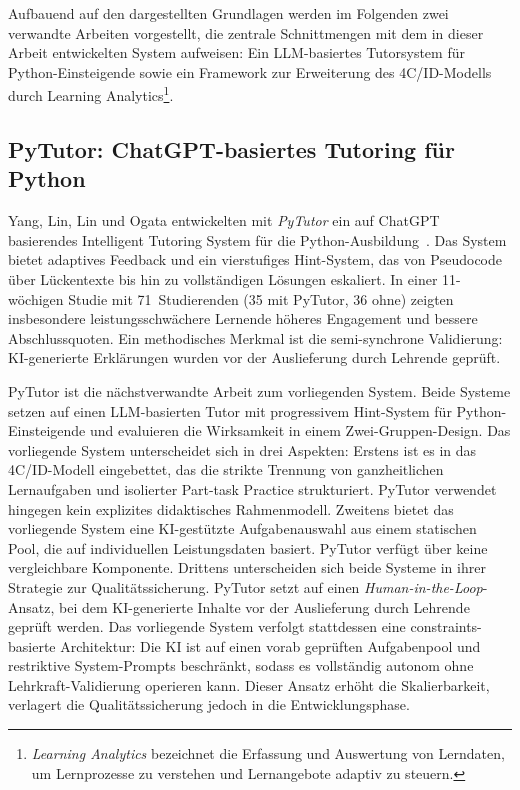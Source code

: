 Aufbauend auf den dargestellten Grundlagen werden im Folgenden zwei verwandte Arbeiten vorgestellt, die zentrale Schnittmengen mit dem in dieser Arbeit entwickelten System aufweisen: Ein LLM-basiertes Tutorsystem für Python-Einsteigende sowie ein Framework zur Erweiterung des 4C/ID-Modells durch Learning Analytics\footnote{\textit{Learning Analytics} bezeichnet die Erfassung und Auswertung von Lerndaten, um Lernprozesse zu verstehen und Lernangebote adaptiv zu steuern.}.

\subsection{PyTutor: ChatGPT-basiertes Tutoring für Python}\label{subsec:pytutor}

Yang, Lin, Lin und Ogata entwickelten mit \textit{PyTutor} ein auf ChatGPT basierendes Intelligent Tutoring System für die Python-Ausbildung~\cite{yang2024pytutor}. Das System bietet adaptives Feedback und ein vierstufiges Hint-System, das von Pseudocode über Lückentexte bis hin zu vollständigen Lösungen eskaliert. In einer 11-wöchigen Studie mit 71~Studierenden (35 mit PyTutor, 36 ohne) zeigten insbesondere leistungsschwächere Lernende höheres Engagement und bessere Abschlussquoten. Ein methodisches Merkmal ist die semi-synchrone Validierung: KI-generierte Erklärungen wurden vor der Auslieferung durch Lehrende geprüft.

PyTutor ist die nächstverwandte Arbeit zum vorliegenden System. Beide Systeme setzen auf einen LLM-basierten Tutor mit progressivem Hint-System für Python-Einsteigende und evaluieren die Wirksamkeit in einem Zwei-Gruppen-Design. Das vorliegende System unterscheidet sich in drei Aspekten: Erstens ist es in das 4C/ID-Modell eingebettet, das die strikte Trennung von ganzheitlichen Lernaufgaben und isolierter Part-task Practice strukturiert. PyTutor verwendet hingegen kein explizites didaktisches Rahmenmodell. Zweitens bietet das vorliegende System eine KI-gestützte Aufgabenauswahl aus einem statischen Pool, die auf individuellen Leistungsdaten basiert. PyTutor verfügt über keine vergleichbare Komponente. Drittens unterscheiden sich beide Systeme in ihrer Strategie zur Qualitätssicherung. PyTutor setzt auf einen \textit{Human-in-the-Loop}-Ansatz, bei dem KI-generierte Inhalte vor der Auslieferung durch Lehrende geprüft werden. Das vorliegende System verfolgt stattdessen eine constraints-basierte Architektur: Die KI ist auf einen vorab geprüften Aufgabenpool und restriktive System-Prompts beschränkt, sodass es vollständig autonom ohne Lehrkraft-Validierung operieren kann. Dieser Ansatz erhöht die Skalierbarkeit, verlagert die Qualitätssicherung jedoch in die Entwicklungsphase.

